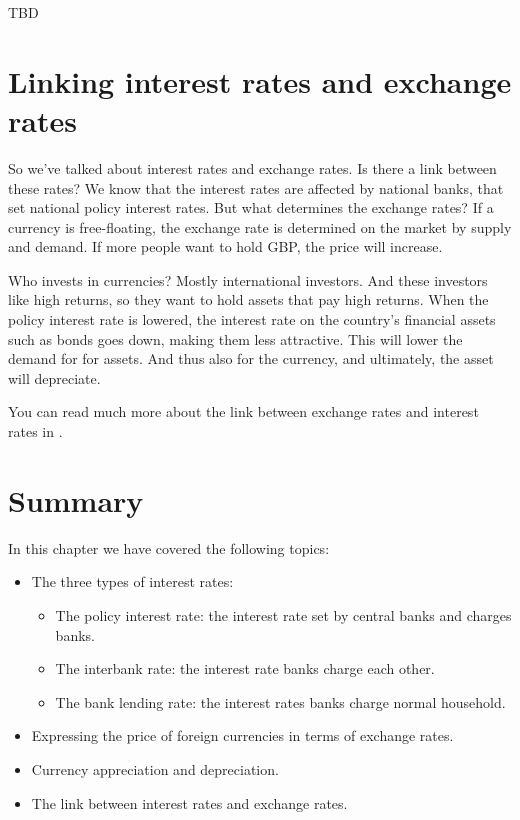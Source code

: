 \documentclass[]{book}
\providecommand{\tightlist}{%
  \setlength{\itemsep}{0pt}\setlength{\parskip}{0pt}}
\begin{document}
TBD

\hypertarget{linking-interest-rates-and-exchange-rates}{%
\section{Linking interest rates and exchange rates}\label{linking-interest-rates-and-exchange-rates}}

So we've talked about interest rates and exchange rates. Is there a link between these rates? We know that the interest rates are affected by national banks, that set national policy interest rates. But what determines the exchange rates? If a currency is free-floating, the exchange rate is determined on the market by supply and demand. If more people want to hold GBP, the price will increase.

Who invests in currencies? Mostly international investors. And these investors like high returns, so they want to hold assets that pay high returns. When the policy interest rate is lowered, the interest rate on the country's financial assets such as bonds goes down, making them less attractive. This will lower the demand for for assets. And thus also for the currency, and ultimately, the asset will depreciate.

You can read much more about the link between exchange rates and interest rates in \citep[chapter 15 in][]{core}.

\hypertarget{summary-4}{%
\section{Summary}\label{summary-4}}

In this chapter we have covered the following topics:

\begin{itemize}
\item
  The three types of interest rates:

  \begin{itemize}
  \tightlist
  \item
    The policy interest rate: the interest rate set by central banks and charges banks.
  \item
    The interbank rate: the interest rate banks charge each other.
  \item
    The bank lending rate: the interest rates banks charge normal household.
  \end{itemize}
\item
  Expressing the price of foreign currencies in terms of exchange rates.
\item
  Currency appreciation and depreciation.
\item
  The link between interest rates and exchange rates.
\end{itemize}
\end{document}
